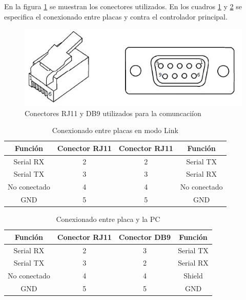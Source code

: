 \documentclass[a4paper,10pt]{article}
\begin{document}
En la figura \ref{rj11db9} se muestran los conectores utilizados. En los cuadros \ref{conexionLink} y \ref{conexionRS232} se especifica el conexionado entre placas y contra el controlador principal.

\begin{figure}
\centering
\includegraphics[scale=.5]{rj11_db9.png}
\caption{Conectores RJ11 y DB9 utilizados para la comuncaci\'ion}
\label{rj11db9}
\end{figure}

\begin{table}
\begin{center}
\begin{tabular}{|c|c|c|c|}
\hline
Funci\'on & Conector RJ11 & Conector RJ11 & Funci\'on\\
\hline
Serial RX & 2 & 2 & Serial TX \\
\hline
Serial TX & 3 & 3 & Serial RX \\
\hline
No conectado & 4 & 4 & No conectado \\
\hline
GND & 5 & 5 &  GND\\
\hline
\end{tabular}
\caption{Conexionado entre placas en modo Link}
\label{conexionLink}
\end{center}
\end{table}

\begin{table}
\begin{center}
\begin{tabular}{|c|c|c|c|}
\hline
Funci\'on & Conector RJ11 & Conector DB9 & Funci\'on\\
\hline
Serial RX & 2 & 3 & Serial TX \\
\hline
Serial TX & 3 & 2 & Serial RX \\
\hline
No conectado & 4 & 4 & Shield \\
\hline
GND & 5 & 5 &  GND\\
\hline
\end{tabular}
\caption{Conexionado entre placa y la PC}
\label{conexionRS232}
\end{center}
\end{table}
\end{document}

